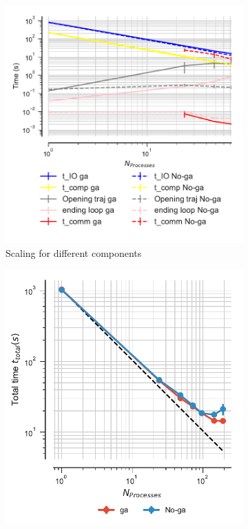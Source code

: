  \begin{figure}[ht!]
\centering
\begin{subfigure}{.3\textwidth}
  \includegraphics[width=\linewidth]{figures/Comparison_IO_compute_scaling_traj_splitting-chain-reader.pdf}
  \caption{Scaling for different components}
  \label{fig:MPIscaling-chain-reader}
\end{subfigure}
\hfill
\begin{subfigure}{.3\textwidth}
  \includegraphics[width=\linewidth]{figures/Comparison_tot_time_traj_splitting-chain-reader.pdf}

\end{subfigure}
\end{figure}
